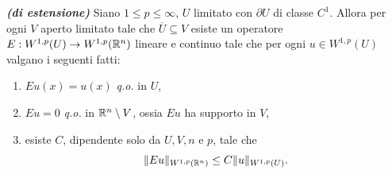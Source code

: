\begin{teorema}\emph{\textbf{(di estensione)}}
	Siano $1 \le p \le \infty$, $U$ limitato con $\partial U$ di classe $C^1$. Allora per ogni $V$ aperto limitato tale che $\overline{U} \subseteq V$ esiste un operatore $E: W^{1,p}(U) \to W^{1,p}(\mathbb{R}^n)$ lineare e continuo tale che per ogni $u \in W^{1,p}(U)$ valgano i seguenti fatti:
	\begin{enumerate}[$(a)$]
		\item $Eu (x) = u(x)$ \emph{q.o.} in $U$,
		\item $Eu = 0$ \emph{q.o.} in $\mathbb{R}^n\setminus V$, ossia $Eu$ ha supporto in $V$,
		\item esiste $C$, dipendente solo da $U,V,n$ e $p$, tale che
		\[ \lVert Eu\rVert_{W^{1,p}(\mathbb{R}^n)} \le C \lVert u\rVert_{W^{1,p}(U)}. \]
	\end{enumerate}
\end{teorema}

